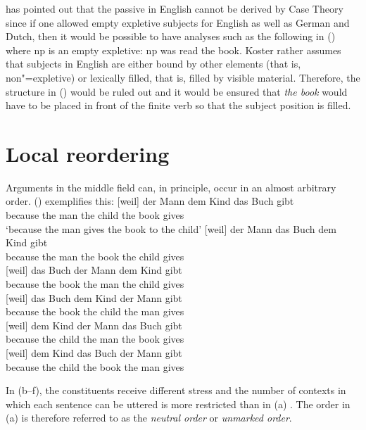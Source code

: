 \noindent
\citet[]{Koster86a} has pointed out that the passive in English cannot be derived by Case
Theory since if one allowed empty expletive subjects for English as well as German and Dutch, then it would be possible
to have analyses such as the following in () where np is an empty expletive:
\ea
np was read the book.
\z
Koster rather assumes that subjects in English are either bound by other elements (that is, non"=expletive) or lexically filled, that
is, filled by visible material.
Therefore, the structure in () would be ruled out and it would be ensured that \emph{the book} would have to be placed in front
of the finite verb so that the subject position is filled.

\section{Local reordering}
\label{sec-GB-lokale-Umstellung}

Arguments in the middle field can, in principle, occur in an almost arbitrary order. () exemplifies this:
\eal
\label{ex-gb-umstellung}
\ex 
\gll {}[weil] der Mann dem Kind das Buch gibt\\
     \spacebr{}because the man the child the book gives\\
\glt `because the man gives the book to the child'
\ex 
\gll {}[weil] der Mann das Buch dem Kind gibt\\
     \spacebr{}because the man the book the child gives\\
\ex\label{ex-das-buch-der-mann-der-frau-gibt} 
\gll {}[weil] das Buch der Mann dem Kind gibt\\
     \spacebr{}because the book the man the child gives\\
\ex 
\gll {}[weil] das Buch dem Kind der Mann gibt\\
     \spacebr{}because the book the child the man gives\\
\ex 
\gll {}[weil] dem Kind der Mann das Buch gibt\\
     \spacebr{}because the child the man the book gives\\
\ex 
\gll {}[weil] dem Kind das Buch der Mann gibt\\
     \spacebr{}because the child the book the man gives\\
\zl

\noindent
In (b--f), the constituents receive different stress and the number of contexts in which each
sentence can be uttered is more restricted than in (a) \citep{Hoehle82a}. The order in (a)
is therefore referred to as the \emph{neutral order} or \emph{unmarked order}.

